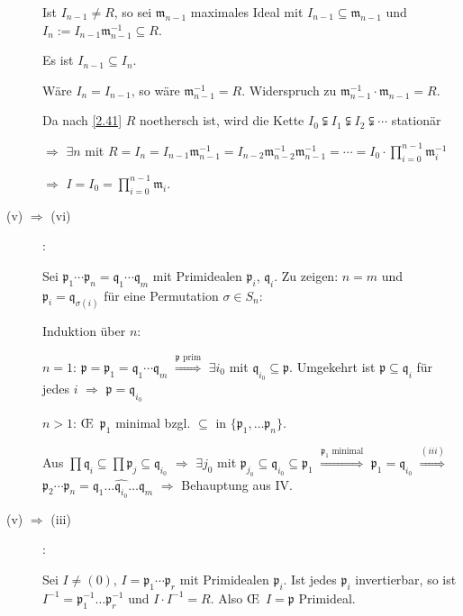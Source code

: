 \begin{Bew}
\begin{description}
Ist $I_{n-1} \neq R$, so sei $\mathfrak{m}_{n-1}$ maximales Ideal mit $I_{n-1} \subseteq \mathfrak{m}_{n-1}$ und $I_n := I_{n-1} \mathfrak{m}_{n-1}^{-1} \subseteq R$.

Es ist $I_{n-1} \subseteq I_n$.

W\"are $I_n = I_{n-1}$, so w\"are $\mathfrak{m}_{n-1}^{-1} = R$. Widerspruch zu $\mathfrak{m}_{n-1}^{-1} \cdot \mathfrak{m}_{n-1} = R$.

Da nach \ref{2.41} $R$ noethersch ist, wird die Kette $I_0 \subsetneqq I_1 \subsetneqq I_2 \subsetneqq \cdots$ station\"ar

$\Rightarrow$ $\exists n$ mit $R = I_n = I_{n-1} \mathfrak{m}_{n-1}^{-1} = I_{n-2} \mathfrak{m}_{n-2}^{-1} \mathfrak{m}_{n-1}^{-1} = \cdots = I_0 \cdot \prod_{i=0}^{n-1} \mathfrak{m}_{i}^{-1}$

$\Rightarrow$ $I = I_0 = \prod_{i=0}^{n-1} \mathfrak{m}_i$.

\item[(v) $\Rightarrow$ (vi)]:

Sei $\mathfrak{p}_1 \cdots \mathfrak{p}_n = \mathfrak{q}_1 \cdots \mathfrak{q}_m$ mit Primidealen $\mathfrak{p}_i$, $\mathfrak{q}_i$. Zu zeigen: $n=m$ und $\mathfrak{p}_i = \mathfrak{q}_{\sigma(i)}$ f\"ur eine Permutation $\sigma \in S_n$:

Induktion \"uber $n$:

$n=1$: $\mathfrak{p} = \mathfrak{p}_1 = \mathfrak{q}_1 \cdots \mathfrak{q}_m$ $\overset{\mathfrak{p}\text{ prim}}{\Rightarrow}$ $\exists i_0$ mit $\mathfrak{q}_{i_0} \subseteq \mathfrak{p}$. Umgekehrt ist $\mathfrak{p} \subseteq \mathfrak{q}_i$ f\"ur jedes $i$ $\Rightarrow$ $\mathfrak{p} = \mathfrak{q}_{i_0}$

$n>1$: \OE\  $\mathfrak{p}_1$ minimal bzgl. $\subseteq$ in $\{ \mathfrak{p}_1,
\ldots \mathfrak{p}_n \}$.

Aus $\prod \mathfrak{q}_i \subseteq \prod \mathfrak{p}_j \subseteq \mathfrak{q}_{i_0}$ $\Rightarrow$ $\exists j_0$ mit $\mathfrak{p}_{j_0} \subseteq \mathfrak{q}_{i_0} \subseteq \mathfrak{p}_1$ $\overset{\mathfrak{p}_1\text{ minimal}}{\Rightarrow}$ $\mathfrak{p}_1 = \mathfrak{q}_{i_0}$ $\overset{(iii)}{\Rightarrow}$ $\mathfrak{p}_2 \cdots \mathfrak{p}_n = \mathfrak{q}_1 \ldots \widehat{\mathfrak{q}_{i_0}} \ldots \mathfrak{q}_m$ $\Rightarrow$ Behauptung aus IV.

\item[(v) $\Rightarrow$ (iii)]:

Sei $I \neq (0)$, $I = \mathfrak{p}_1 \cdots \mathfrak{p}_r$ mit Primidealen
$\mathfrak{p}_i$. Ist jedes $\mathfrak{p}_i$ invertierbar, so ist $I^{-1} =
\mathfrak{p}_1^{-1} \ldots \mathfrak{p}_r^{-1}$ und $I \cdot I^{-1} = R$. Also
\OE\  $I = \mathfrak{p}$ Primideal.


\end{description}
\end{Bew}
